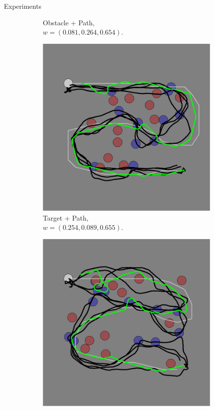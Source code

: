 \documentclass[final]{beamer}
\begin{document}
\begin{frame}{}
\begin{textblock}{37}
\begin{block}{Experiments}
\begin{figure}[h]
\begin{subfigure}[b]{0.4\textwidth}
\caption{Obstacle + Path,\\$w = (0.081, 0.264, 0.654)$. }
\end{subfigure}
\begin{subfigure}[b]{0.4\textwidth}
\includegraphics[width=\textwidth]{task_3.png}
\caption{Target + Path, \\$w = (0.254, 0.089, 0.655)$. }
\end{subfigure}
\begin{subfigure}[b]{0.4\textwidth}
\includegraphics[width=\textwidth]{task_4.png}

\end{subfigure}
\end{figure}
\end{block}
\end{textblock}
\end{frame}
\end{document}
